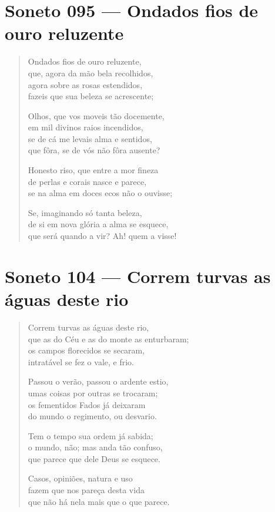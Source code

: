 \documentclass[10pt,a5paper,oneside]{book}
\begin{document}
\chapter{Soneto 095 --- Ondados fios de ouro reluzente}

\begin{verse}
Ondados fios de ouro reluzente,\\
que, agora da mão bela recolhidos,\\
agora sobre as rosas estendidos,\\
fazeis que sua beleza se acrescente;

Olhos, que vos moveis tão docemente,\\
em mil divinos raios incendidos,\\
se de cá me levais alma e sentidos,\\
que fôra, se de vós não fôra ausente?

Honesto riso, que entre a mor fineza\\
de perlas e corais nasce e parece,\\
se na alma em doces ecos não o ouvisse;

Se, imaginando só tanta beleza,\\
de si em nova glória a alma se esquece,\\
que será quando a vir? Ah! quem a visse!
\end{verse}

\chapter{Soneto 104 --- Correm turvas as águas deste rio}

\begin{verse}
Correm turvas as águas deste rio,\\
que as do Céu e as do monte as enturbaram;\\
os campos florecidos se secaram,\\
intratável se fez o vale, e frio.

Passou o verão, passou o ardente estio,\\
umas coisas por outras se trocaram;\\
os fementidos Fados já deixaram\\
do mundo o regimento, ou desvario.

Tem o tempo sua ordem já sabida;\\
o mundo, não; mas anda tão confuso,\\
que parece que dele Deus se esquece.

Casos, opiniões, natura e uso\\
fazem que nos pareça desta vida\\
que não há nela mais que o que parece.
\end{verse}
\end{document}
